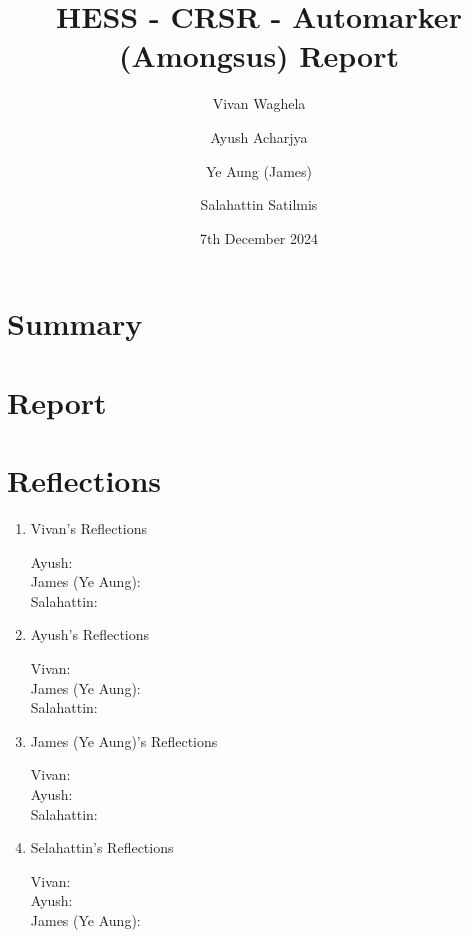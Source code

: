 \documentclass[a4paper, 12pt]{article}
\begin{document}
\title{HESS - CRSR - Automarker (Amongsus) Report}
\author{Vivan Waghela \and Ayush Acharjya \and Ye Aung (James) \and Salahattin Satilmis}
\date{7th December 2024}
\maketitle

\section*{Summary}

\section*{Report}

\section*{Reflections}
\begin{enumerate}
    \item Vivan's Reflections
        \begin{description}
            \item[Ayush: ] %
            \item[James (Ye Aung): ] %
            \item[Salahattin: ] %
        \end {description}
    \item Ayush's Reflections
        \begin{description}
            \item[Vivan: ] %
            \item[James (Ye Aung): ] %
            \item[Salahattin: ] %
        \end {description}
    \item James (Ye Aung)'s Reflections
        \begin{description}
            \item[Vivan: ] %
            \item[Ayush: ] %
            \item[Salahattin: ] %
        \end {description}
    \item Selahattin's Reflections
        \begin{description}
            \item[Vivan: ] %
            \item[Ayush: ] %
            \item[James (Ye Aung): ] %
        \end {description}
\end{enumerate}
\end{document}

